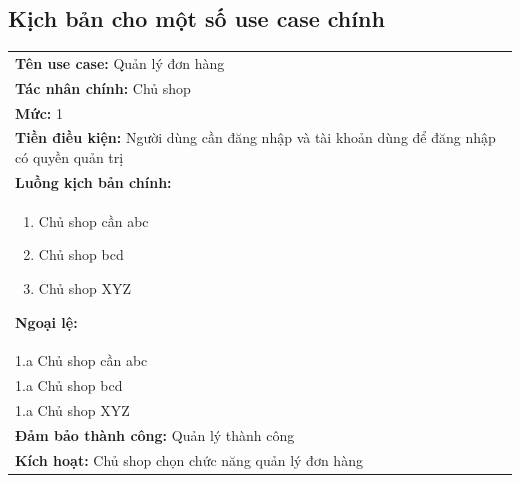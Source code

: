 \subsection{Kịch bản cho một số use case chính}
\begin{center}
\begin{tabularx}{\linewidth}{|X|}
\cline{1-2}
    \textbf{Tên use case:} Quản lý đơn hàng\\
    \textbf{Tác nhân chính:} Chủ shop\\
    \textbf{Mức:} 1\\
    \textbf{Tiền điều kiện:} Người dùng cần đăng nhập và tài khoản dùng để đăng nhập có quyền quản trị\\
    \textbf{Luồng kịch bản chính:}\\
    \begin{enumerate}
        \vspace{-2em}
        \itemsep-0.5em
        \item Chủ shop cần abc
        \item Chủ shop bcd
        \item Chủ shop XYZ
        \vspace{-1em}
    \end{enumerate}
    \textbf{Ngoại lệ:}\\
    \hspace{1em}1.a Chủ shop cần abc\\
    \hspace{1em}1.a Chủ shop bcd\\
    \hspace{1em}1.a Chủ shop XYZ\\
    \textbf{Đảm bảo thành công:} Quản lý thành công\\
    \textbf{Kích hoạt:} Chủ shop chọn chức năng quản lý đơn hàng
\cline{1-2}
\end{tabularx}
\end{center}
